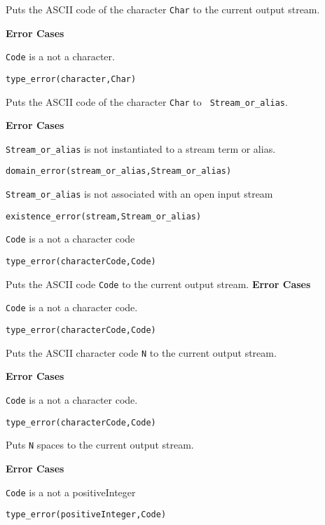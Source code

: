 \begin{description}
Puts the ASCII code of the character {\tt Char} to the current output
stream.

{\bf Error Cases}
\bi
\item 	{\tt Code} is a not a character.
\bi
\item 	{\tt type\_error(character,Char)}
\ei
\ei

Puts the ASCII code of the character {\tt Char} to {\tt
Stream\_or\_alias}.

{\bf Error Cases}
\bi
\item 	{\tt Stream\_or\_alias} is not instantiated to a stream term or alias.
\bi
\item 	{\tt domain\_error(stream\_or\_alias,Stream\_or\_alias)}
\ei
\item 	{\tt Stream\_or\_alias} is not associated with an open input stream
\bi
\item 	{\tt existence\_error(stream,Stream\_or\_alias)}
\ei
\item 	{\tt Code} is a not a character code
\bi
\item 	{\tt type\_error(characterCode,Code)}
\ei
\ei


Puts the ASCII code {\tt Code} to the current output stream.
{\bf Error Cases}
\bi
\item 	{\tt Code} is a not a character code.
\bi
\item 	{\tt type\_error(characterCode,Code)}
\ei
\ei

    Puts the ASCII character code {\tt N} to the current output stream.

{\bf Error Cases}
\bi
\item 	{\tt Code} is a not a character code.
\bi
\item 	{\tt type\_error(characterCode,Code)}
\ei
\ei

    Puts {\tt N} spaces to the current output stream. 

{\bf Error Cases}
\bi
\item 	{\tt Code} is a not a positiveInteger
\bi
\item 	{\tt type\_error(positiveInteger,Code)}
\ei
\ei

\end{description}

